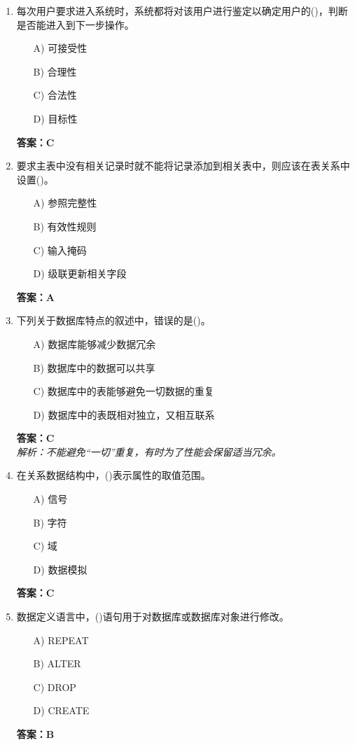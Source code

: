 \documentclass[a4paper,12pt]{article}
\begin{document}
\begin{enumerate}[label=\arabic*.]
\item 每次用户要求进入系统时，系统都将对该用户进行鉴定以确定用户的()，判断是否能进入到下一步操作。
\begin{itemize}
    \item[A)] 可接受性
    \item[B)] 合理性
    \item[C)] 合法性
    \item[D)] 目标性
\end{itemize}
\textbf{答案：C}

\item 要求主表中没有相关记录时就不能将记录添加到相关表中，则应该在表关系中设置()。
\begin{itemize}
    \item[A)] 参照完整性
    \item[B)] 有效性规则
    \item[C)] 输入掩码
    \item[D)] 级联更新相关字段
\end{itemize}
\textbf{答案：A}

\item 下列关于数据库特点的叙述中，错误的是()。
\begin{itemize}
    \item[A)] 数据库能够减少数据冗余
    \item[B)] 数据库中的数据可以共享
    \item[C)] 数据库中的表能够避免一切数据的重复
    \item[D)] 数据库中的表既相对独立，又相互联系
\end{itemize}
\textbf{答案：C} \\
\textit{解析：不能避免“一切”重复，有时为了性能会保留适当冗余。}

\item 在关系数据结构中，()表示属性的取值范围。
\begin{itemize}
    \item[A)] 信号
    \item[B)] 字符
    \item[C)] 域
    \item[D)] 数据模拟
\end{itemize}
\textbf{答案：C}

\item 数据定义语言中，()语句用于对数据库或数据库对象进行修改。
\begin{itemize}
    \item[A)] REPEAT
    \item[B)] ALTER
    \item[C)] DROP
    \item[D)] CREATE
\end{itemize}
\textbf{答案：B}


\end{enumerate}
\end{document}
